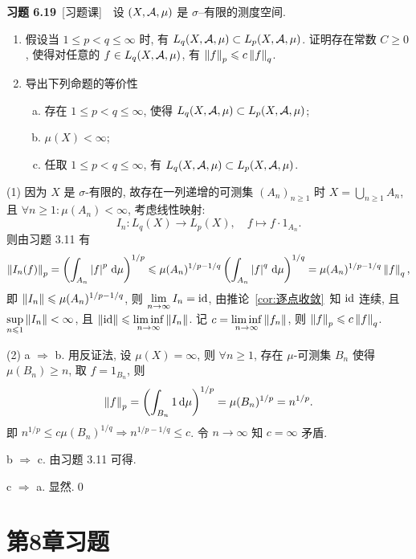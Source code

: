 	\textbf{习题 6.19}\ [习题课]\ \ 设 $ (X, \mathcal{A}, \mu) $ 是 $ \sigma $--有限的测度空间.
	\begin{enumerate}[(1)]
		\item 假设当 $ 1\leqslant p<q\leqslant\infty $ 时, 有 $ L_{q}(X, \mathcal{A}, \mu)\subset L_{p}(X, \mathcal{A}, \mu) $. 证明存在常数 $ C\geqslant0 $, 使得对任意的 $ f\in L_{q}(X, \mathcal{A}, \mu) $, 有 $ \left\| f \right\|_{p}\leqslant c\left\| f \right\|_{q} $.
		\item 导出下列命题的等价性
		\begin{enumerate}[a. ]
			\item 存在 $ 1\leqslant p<q\leqslant\infty $, 使得 $ L_{q}(X, \mathcal{A}, \mu)\subset L_{p}(X, \mathcal{A}, \mu) $;
			\item $ \mu(X)<\infty $;
			\item 任取 $ 1\leqslant p<q\leqslant\infty $, 有 $ L_{q}(X, \mathcal{A}, \mu)\subset L_{p}(X, \mathcal{A}, \mu) $.
		\end{enumerate}
	\end{enumerate}
	\begin{Proof}
		(1) 因为 $ X $ 是 $ \sigma $-有限的, 故存在一列递增的可测集 $ (A_{n})_{n\geqslant1} $ 时 $ X=\bigcup_{n\geqslant1}A_{n} $, 且 $ \forall n\geqslant1:\mu(A_{n})<\infty $, 考虑线性映射:
		\[
			I_{n}: L_{q}(X)\to L_{p}(X), \quad f\mapsto f\cdot 1_{A_{n}}.
		\] 
		则由习题 3.11 有
		\[
			\left\| I_{n}(f) \right\|_{p}=\left( \int_{A_{n}}\left| f \right| ^{p}\,\mathrm{d}\mu \right)^{1/p}\leqslant \mu(A_{n})^{1/p-1/q}\left( \int_{A_{n}}\left| f \right| ^{q}\,\mathrm{d}\mu \right)^{1/q}=\mu(A_{n})^{1/p-1/q}\left\| f \right\|_{q},
		\]
		即 $ \left\| I_{n} \right\|\leqslant\mu(A_{n})^{1/p-1/q} $, 则 $ \lim\limits_{n\to\infty}I_{n}=\mathrm{id} $, 由推论~\ref{cor:逐点收敛}~知 $ \mathrm{id} $ 连续, 且 $ \sup\limits_{n\leqslant1}\left\| I_{n} \right\|<\infty $, 且 $ \left\| \mathrm{id} \right\|\leqslant\liminf\limits_{n\to\infty}\left\| I_{n} \right\| $. 记 $ c=\liminf\limits_{n\to\infty}\left\| f_{n} \right\| $, 则 $ \left\| f \right\|_{p}\leqslant c\left\| f \right\|_{q} $.
		
		(2) a $ \Rightarrow $ b. 用反证法, 设 $ \mu(X)=\infty $, 则 $ \forall n\geqslant1 $, 存在 $ \mu $-可测集 $ B_{n} $ 使得 $ \mu(B_{n})\geqslant n $, 取 $ f = 1_{B_{n}} $, 则
		\[
			\left\| f \right\|_{p}=\left( \int_{B_{n}}1\,\mathrm{d}\mu \right)^{1/p}=\mu(B_{n})^{1/p}=n^{1/p}.
		\]
		即 $ n^{1/p}\leqslant c\mu(B_{n})^{1/q}\Longrightarrow n^{1/p-1/q}\leqslant c $. 令 $ n\to \infty $ 知 $ c=\infty $ 矛盾.

		b $ \Rightarrow $ c. 由习题 3.11 可得.

		c $ \Rightarrow $ a. 显然.\qed
	\end{Proof}

\section{第8章习题}


